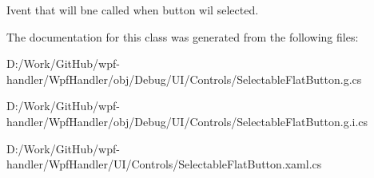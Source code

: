 Ivent that will bne called when button wil selected. 



The documentation for this class was generated from the following files\+:\begin{DoxyCompactItemize}
\item 
D\+:/\+Work/\+Git\+Hub/wpf-\/handler/\+Wpf\+Handler/obj/\+Debug/\+U\+I/\+Controls/Selectable\+Flat\+Button.\+g.\+cs\item 
D\+:/\+Work/\+Git\+Hub/wpf-\/handler/\+Wpf\+Handler/obj/\+Debug/\+U\+I/\+Controls/Selectable\+Flat\+Button.\+g.\+i.\+cs\item 
D\+:/\+Work/\+Git\+Hub/wpf-\/handler/\+Wpf\+Handler/\+U\+I/\+Controls/Selectable\+Flat\+Button.\+xaml.\+cs\end{DoxyCompactItemize}
